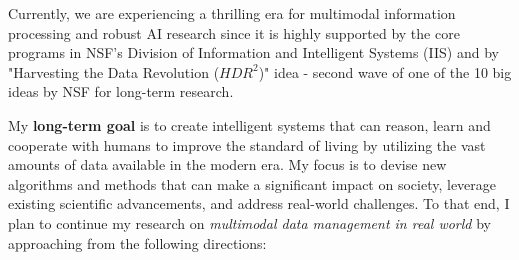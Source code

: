 Currently, we are experiencing a thrilling era for multimodal information processing and robust AI research since it is highly supported by the core programs in NSF's Division of Information and Intelligent Systems (IIS) and by "Harvesting the Data Revolution ($HDR^2$)" idea - second wave of one of the 10 big ideas
by NSF for long-term research.


My \textbf{long-term goal} is to create intelligent systems that can reason, learn and cooperate with humans to improve the standard of living by utilizing the vast amounts of data available in the modern era. My focus is to devise new algorithms and methods that can make a significant impact on society, leverage existing scientific advancements, and address real-world challenges. To that end, I
plan to continue my research on \textit{multimodal data management in real world} by approaching from the following directions:

